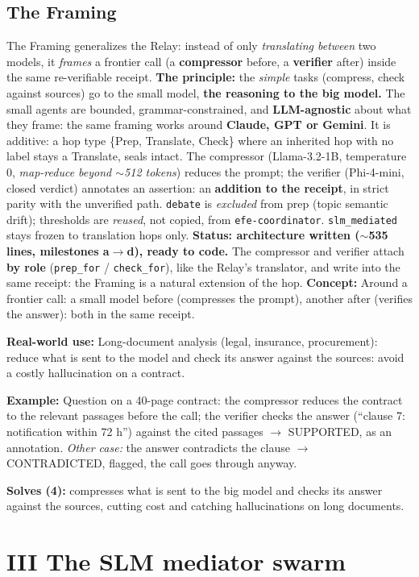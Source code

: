 \documentclass[11pt]{article}
\newcommand{\concept}[1]{{\color{efenavy}\textbf{Concept:} }#1\par}
\newcommand{\exemple}[1]{{\color{efeamber}\textbf{Example:} }#1\par}
\newcommand{\utilite}[1]{{\color{efeplum}\textbf{Real-world use:} }#1\par}
\newcommand{\solves}[2]{{\color{efesolve}\textbf{Solves #1:} }#2\par}
\begin{document}
\subsection{The Framing}
The Framing generalizes the Relay: instead of only \emph{translating between} two models, it
\emph{frames} a frontier call (a \textbf{compressor} before, a \textbf{verifier} after) inside the same re-verifiable receipt. \textbf{The principle:} the \emph{simple} tasks (compress, check against sources) go to the small model, \textbf{the reasoning to the big model.} The small agents are
bounded, grammar-constrained, and \textbf{LLM-agnostic} about what they frame: the same framing works
around \textbf{Claude, GPT or Gemini}. It is additive: a hop type \{Prep, Translate, Check\} where an
inherited hop with no label stays a Translate, seals intact. The compressor (Llama-3.2-1B,
temperature 0, \emph{map-reduce beyond $\sim$512 tokens}) reduces the prompt; the verifier
(Phi-4-mini, closed verdict) annotates an assertion: an \textbf{addition to the receipt}, in strict
parity with the unverified path. \texttt{debate} is \emph{excluded} from prep (topic semantic drift);
thresholds are \emph{reused}, not copied, from \texttt{efe-coordinator}. \texttt{slm\_mediated} stays
frozen to translation hops only.
\textbf{Status: architecture written ($\sim$535 lines, milestones a$\rightarrow$d), ready to code.}
The compressor and verifier attach \textbf{by role} (\texttt{prep\_for} / \texttt{check\_for}), like
the Relay's translator, and write into the same receipt: the Framing is a natural extension of the
hop.
\concept{Around a frontier call: a small model before (compresses the prompt), another after
(verifies the answer): both in the same receipt.}
\utilite{Long-document analysis (legal, insurance, procurement): reduce what is sent to the model and
check its answer against the sources: avoid a costly hallucination on a contract.}
\exemple{Question on a 40-page contract: the compressor reduces the contract to the relevant
passages before the call; the verifier checks the answer (``clause 7: notification within 72 h'')
against the cited passages $\rightarrow$ SUPPORTED, as an annotation. \emph{Other case:} the answer
contradicts the clause $\rightarrow$ CONTRADICTED, flagged, the call goes through anyway.}
\solves{(4)}{compresses what is sent to the big model and checks its answer against the sources, cutting cost and catching hallucinations on long documents.}

\section{III \;\textbar\; The SLM mediator swarm}
\end{document}
